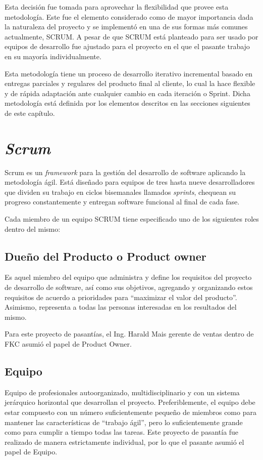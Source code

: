 Esta decisión fue tomada para aprovechar la flexibilidad que provee esta metodología. Este fue el elemento considerado como de mayor importancia dada la naturaleza del proyecto y se implementó en una de sus formas más comunes actualmente, SCRUM. A pesar de que SCRUM está planteado para ser usado por equipos de desarrollo fue ajustado para el proyecto en el que el pasante trabajo en su mayoría individualmente.

Esta metodología tiene un proceso de desarrollo iterativo incremental basado en entregas parciales y regulares del producto final al cliente, lo cual la hace flexible y de rápida adaptación ante cualquier cambio en cada iteración o Sprint. Dicha metodología está definida por los elementos descritos en las secciones siguientes de este capítulo.

\section{\emph{Scrum}}

Scrum es un \emph{framework} para la gestión del desarrollo de software aplicando la metodología ágil. Está diseñado para equipos de tres hasta nueve desarrolladores que dividen su trabajo en ciclos bisemanales llamados \emph{sprints}, chequean su progreso constantemente y entregan software funcional al final de cada fase.

Cada miembro de un equipo SCRUM tiene especificado uno de los siguientes roles dentro del mismo:

\subsection{Dueño del Producto o Product owner}
Es aquel miembro del equipo que administra y define los requisitos del proyecto de desarrollo de software, así como sus objetivos, agregando y organizando estos requisitos de acuerdo a prioridades para “maximizar el valor del producto”. Asimismo, representa a todas las personas interesadas en los resultados del mismo.

Para este proyecto de pasantías, el Ing. Harald Mais gerente de ventas dentro de FKC asumió el papel de Product Owner.

\subsection{Equipo}
Equipo de profesionales autoorganizado, multidisciplinario y con un sistema jerárquico horizontal que desarrollan el proyecto. Preferiblemente, el equipo debe estar compuesto con un número suficientemente pequeño de miembros como para mantener las características de “trabajo ágil”, pero lo suficientemente grande como para cumplir a tiempo todas las tareas.
Este proyecto de pasantía fue realizado de manera estrictamente individual, por lo que el pasante asumió el papel de Equipo.

